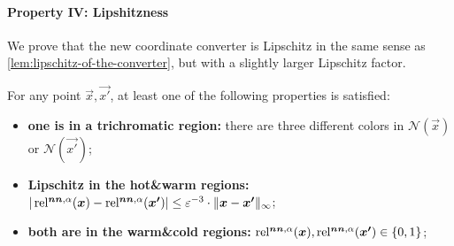 \paragraph{Property IV: Lipshitzness} We prove that the new coordinate converter is Lipschitz in the same sense as \cref{lem:lipschitz-of-the-converter}, but with a slightly larger Lipschitz factor.
\begin{lemma}
    \label{lem:lipschitz-of-the-converter-for-symmetry}
    For any point $\vec{x}, \vec{x'}$, at least one of the following properties is satisfied:
    \begin{itemize}[itemsep=0em]
        \item {\bf one is in a trichromatic region:} there are three different colors in $\mathcal{N}(\vec{x})$ or $\mathcal{N}(\vec{x'})$;
        \item {\bf Lipschitz in the hot\&warm regions:} $|\operatorname*{rel^{\boldsymbol{nn},\alpha}}(\boldsymbol{x})-\operatorname*{rel^{\boldsymbol{nn},\alpha}}(\boldsymbol{x'})|\leq \varepsilon^{-3}\cdot \| {\boldsymbol{x}-\boldsymbol{x'}} \|_{\infty}$; 
        \item {\bf both are in the warm\&cold regions:} $\operatorname*{rel^{\boldsymbol{nn},\alpha}}(\boldsymbol{x}),\operatorname*{rel^{\boldsymbol{nn},\alpha}}(\boldsymbol{x'})\in \{0,1\}$;
    \end{itemize}
\end{lemma}
